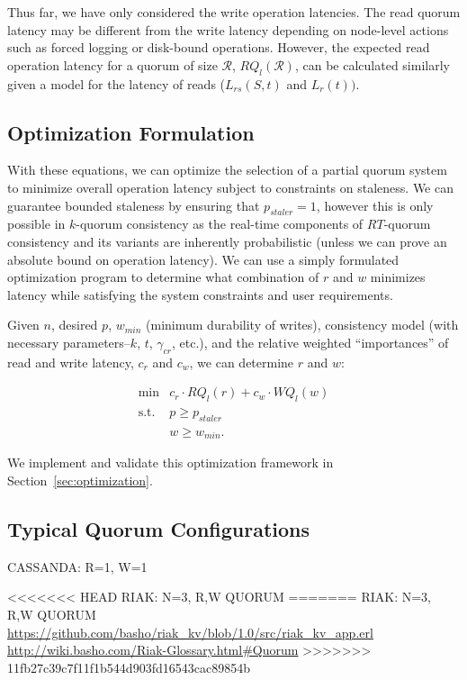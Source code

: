 \documentclass{vldb}
\begin{document}
Thus far, we have only considered the write operation latencies.  The
read quorum latency may be different from the write latency depending
on node-level actions such as forced logging or disk-bound operations.
However, the expected read operation latency for a quorum of size
$\mathcal{R}$, $RQ_l(\mathcal{R})$, can be calculated similarly given a
model for the latency of reads ($L_{rs}(S,t)$ and $L_r(t))$.

\subsection{Optimization Formulation}

With these equations, we can optimize the selection of a partial
quorum system to minimize overall operation latency subject to
constraints on staleness. We can guarantee bounded staleness by
ensuring that $p_{staler} = 1$, however this is only possible in
$k$-quorum consistency as the real-time components of $RT$-quorum
consistency and its variants are inherently probabilistic (unless we
can prove an absolute bound on operation latency).  We can use a
simply formulated optimization program to determine what combination
of $r$ and $w$ minimizes latency while satisfying the system
constraints and user requirements.

Given $n$, desired $p$, $w_{min}$ (minimum durability of writes),
consistency model (with necessary parameters--$k$, $t$, $\gamma_{cr}$,
etc.), and the relative weighted ``importances'' of read
and write latency, $c_r$ and $c_w$, we can determine $r$ and $w$:

\begin{equation}
 \begin{array}{rl}
    \min        & c_r\cdot RQ_l(r) +c_w \cdot WQ_l(w) \\
    \mbox{s.t.} & p \ge p_{staler} \\
                & w \ge w_{min}.
    \end{array}
\end{equation}

We implement and validate this optimization framework in
Section~\ref{sec:optimization}.

\subsection{Typical Quorum Configurations}

CASSANDA: R=1, W=1 

<<<<<<< HEAD
RIAK: N=3, R,W QUORUM 
=======
RIAK: N=3, R,W QUORUM \url{https://github.com/basho/riak_kv/blob/1.0/src/riak_kv_app.erl}
\url{http://wiki.basho.com/Riak-Glossary.html#Quorum}
>>>>>>> 11fb27c39c7f11f1b544d903fd16543cac89854b
\end{document}
